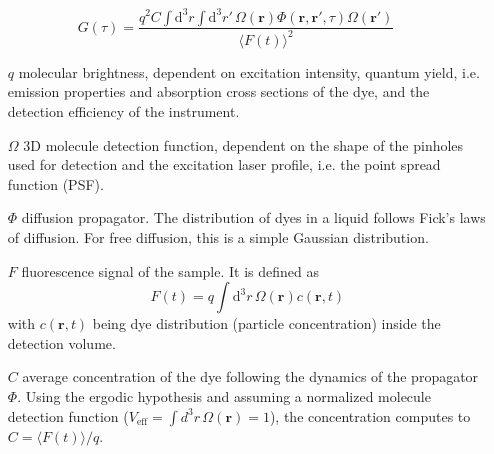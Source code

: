 	\begin{minipage}{\textwidth}
	\begin{equation}
	G(\tau) = \frac{  q^2 C \int \! \mathrm{d}^3 r \int \! \mathrm{d}^3 r'  \, \Omega(\mathbf{r})\Phi(\mathbf{r}, \mathbf{r'}, \tau) \Omega(\mathbf{r'})  }{\langle F(t) \rangle^2}
	\end{equation}
	\begin{itemize} \small
	\item[$q$] molecular brightness, dependent on excitation intensity, quantum yield, i.e. emission properties and absorption cross sections of the dye, and the detection efficiency of the instrument.
	\item[$\Omega$] 3D molecule detection function, dependent on the shape of the pinholes used for detection and the excitation laser profile, i.e. the point spread function (PSF).
	\item[$\Phi$] diffusion propagator. The distribution of dyes in a liquid follows Fick's laws of diffusion. For free diffusion, this is a simple Gaussian distribution.
	\item[$F$] fluorescence signal of the sample. It is defined as
	\[ F(t) = q \int \! \mathrm{d}^3 r \, \Omega(\mathbf{r}) c(\mathbf{r}, t) \] with $c(\mathbf{r}, t)$ being dye distribution (particle concentration) inside the detection volume.
		\item[$C$] average concentration of the dye following the dynamics of the propagator $\Phi$. Using the ergodic hypothesis and assuming a normalized molecule detection function (${V_\mathrm{eff} = \int \!\! d^3r \, \Omega(\mathbf{r}) = 1}$), the concentration computes to $ C = \langle F(t) \rangle / q$.
	\end{itemize}
	\end{minipage}
	
	
